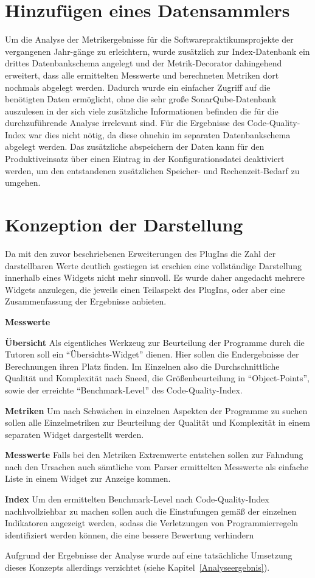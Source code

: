 \documentclass[da,ngerman]{stthesis}
\begin{document}
		\section{Hinzufügen eines Datensammlers}
  			Um die Analyse der Metrikergebnisse für die Softwarepraktikumsprojekte der vergangenen Jahr-gänge zu erleichtern, wurde zusätzlich zur Index-Datenbank ein drittes Datenbankschema angelegt und der Metrik-Decorator dahingehend erweitert, dass alle ermittelten Messwerte und berechneten Metriken dort nochmals abgelegt werden. Dadurch wurde ein einfacher Zugriff auf die benötigten Daten ermöglicht, ohne die sehr große SonarQube-Datenbank auszulesen in der sich viele zusätzliche Informationen befinden die für die durchzuführende Analyse irrelevant sind. Für die Ergebnisse des Code-Quality-Index war dies nicht nötig, da diese ohnehin im separaten Datenbankschema abgelegt werden. Das zusätzliche abspeichern der Daten kann für den Produktiveinsatz über einen Eintrag in der Konfigurationsdatei deaktiviert werden, um den entstandenen zusätzlichen Speicher- und Rechenzeit-Bedarf zu umgehen.
  		\section{Konzeption der Darstellung}
  			Da mit den zuvor beschriebenen Erweiterungen des PlugIns die Zahl der darstellbaren Werte deutlich gestiegen ist erschien eine vollständige Darstellung innerhalb eines Widgets nicht mehr sinnvoll. Es wurde daher angedacht mehrere Widgets anzulegen, die jeweils einen Teilaspekt des PlugIns, oder aber eine Zusammenfassung der Ergebnisse anbieten.
  			\begin{labeling}{\textbf{Messwerte}}
				\item [\textbf{Übersicht}] Als eigentliches Werkzeug zur Beurteilung der Programme durch die Tutoren soll ein "`Übersichts-Widget"' dienen. Hier sollen die Endergebnisse der Berechnungen ihren Platz finden. Im Einzelnen also die Durchschnittliche Qualität und Komplexität nach Sneed, die Größenbeurteilung in "`Object-Points"', sowie der erreichte "`Benchmark-Level"' des Code-Quality-Index.
				\item [\textbf{Metriken}] Um nach Schwächen in einzelnen Aspekten der Programme zu suchen sollen alle Einzelmetriken zur Beurteilung der Qualität und Komplexität in einem separaten Widget dargestellt werden.
				\item [\textbf{Messwerte}] Falls bei den Metriken Extremwerte entstehen sollen zur Fahndung nach den Ursachen auch sämtliche vom Parser ermittelten Messwerte als einfache Liste in einem Widget zur Anzeige kommen.
				\item [\textbf{Index}] Um den ermittelten Benchmark-Level nach Code-Quality-Index nachhvollziehbar zu machen sollen auch die Einstufungen gemäß der einzelnen Indikatoren angezeigt werden, sodass die Verletzungen von Programmierregeln identifiziert werden können, die eine bessere Bewertung verhindern
			\end{labeling}
  			Aufgrund der Ergebnisse der Analyse wurde auf eine tatsächliche Umsetzung dieses Konzepts allerdings verzichtet (siehe Kapitel~\ref{Analyseergebnis}).
\end{document}
